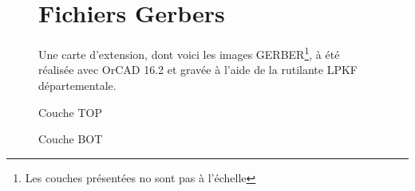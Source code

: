 \begin{figure}[hbtp]
\section{Fichiers Gerbers}
Une carte d'extension, dont voici les images GERBER\footnote{Les couches présentées no sont pas à l'échelle}, à été réalisée avec OrCAD 16.2 et gravée à l'aide de la rutilante LPKF départementale.
\caption{Couche TOP}
\centering
{}

\bigskip
\bigskip
\bigskip
\bigskip
\bigskip

\caption{Couche BOT}
\end{figure}


